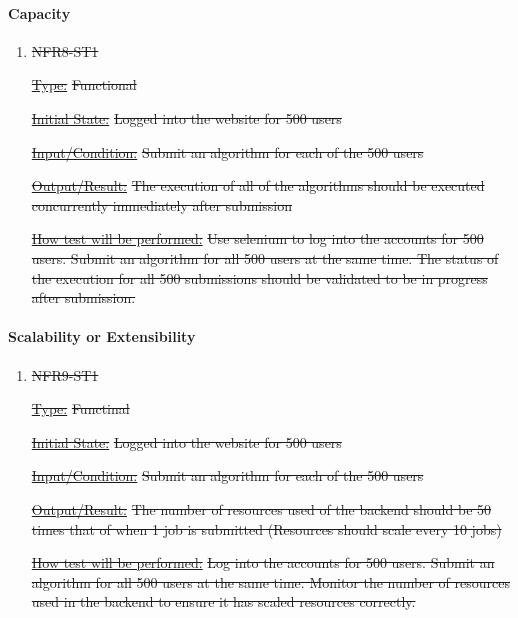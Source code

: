 \documentclass[12pt, titlepage]{article}
\begin{document}
\paragraph{Capacity}

\begin{enumerate}

\item{\sout{NFR8-ST1\\}}

\underline{\sout{Type:}} \sout{Functional}

\underline{\sout{Initial State:}} \sout{Logged into the website for 500 users}

\underline{\sout{Input/Condition:}} \sout{Submit an algorithm for each of the 500 users}

\underline{\sout{Output/Result:}} \sout{The execution of all of the algorithms should be executed concurrently immediately after submission}

\underline{\sout{How test will be performed:}} 
\sout{Use selenium to log into the accounts for 500 users. Submit an algorithm for all 500 users at the same time. The status of the execution for all 500 submissions should be validated to be in progress after submission.}

\end{enumerate}

\paragraph{Scalability or Extensibility}

\begin{enumerate}

\item{\sout{NFR9-ST1\\}}

\underline{\sout{Type:}} \sout{Functinal}

\underline{\sout{Initial State:}} \sout{Logged into the website for 500 users}

\underline{\sout{Input/Condition:}} \sout{Submit an algorithm for each of the 500 users}

\underline{\sout{Output/Result:}} \sout{The number of resources used of the backend should be 50 times that of when 1 job is submitted (Resources should scale every 10 jobs)}

\underline{\sout{How test will be performed:}} 
\sout{Log into the accounts for 500 users. Submit an algorithm for all 500 users at the same time. Monitor the number of resources used in the backend to ensure it has scaled resources correctly.}

\end{enumerate}
\end{document}
